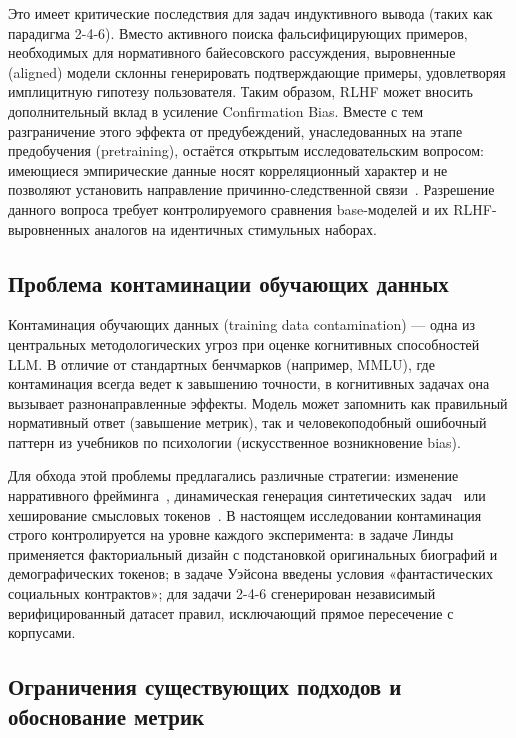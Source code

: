 Это имеет критические последствия для задач индуктивного вывода (таких как парадигма 2-4-6). Вместо активного поиска фальсифицирующих примеров, необходимых для нормативного байесовского рассуждения, выровненные (aligned) модели склонны генерировать подтверждающие примеры, удовлетворяя имплицитную гипотезу пользователя. Таким образом, RLHF может вносить дополнительный вклад в усиление Confirmation Bias. Вместе с тем разграничение этого эффекта от предубеждений, унаследованных на этапе предобучения (pretraining), остаётся открытым исследовательским вопросом: имеющиеся эмпирические данные носят корреляционный характер и не позволяют установить направление причинно-следственной связи~\cite{batista2026rational}. Разрешение данного вопроса требует контролируемого сравнения base-моделей и их RLHF-выровненных аналогов на идентичных стимульных наборах.

\subsection{Проблема контаминации обучающих данных}

Контаминация обучающих данных (training data contamination) --- одна из центральных методологических угроз при оценке когнитивных способностей LLM. В отличие от стандартных бенчмарков (например, MMLU), где контаминация всегда ведет к завышению точности, в когнитивных задачах она вызывает разнонаправленные эффекты. Модель может запомнить как правильный нормативный ответ (завышение метрик), так и человекоподобный ошибочный паттерн из учебников по психологии (искусственное возникновение bias).

Для обхода этой проблемы предлагались различные стратегии: изменение нарративного фрейминга~\cite{suri2024large}, динамическая генерация синтетических задач~\cite{jiang2024peek} или хеширование смысловых токенов~\cite{chadimova2024meaningless}. В настоящем исследовании контаминация строго контролируется на уровне каждого эксперимента: в задаче Линды применяется факториальный дизайн с подстановкой оригинальных биографий и демографических токенов; в задаче Уэйсона введены условия «фантастических социальных контрактов»; для задачи 2-4-6 сгенерирован независимый верифицированный датасет правил, исключающий прямое пересечение с корпусами.

\subsection{Ограничения существующих подходов и обоснование метрик}

